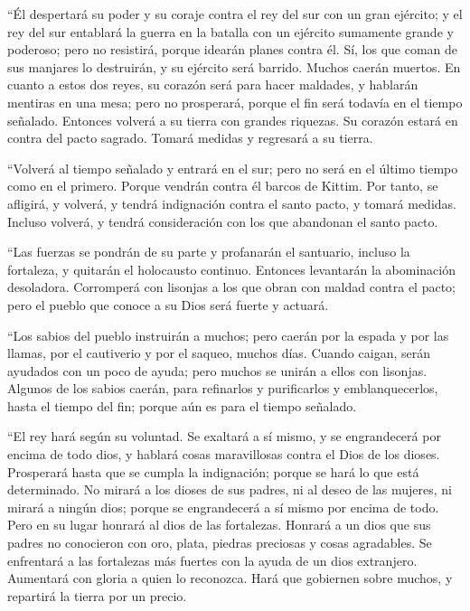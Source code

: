  ``Él despertará su poder y su coraje contra el rey del
sur con un gran ejército; y el rey del sur entablará la guerra en la
batalla con un ejército sumamente grande y poderoso; pero no resistirá,
porque idearán planes contra él.  Sí, los que coman de
sus manjares lo destruirán, y su ejército será barrido. Muchos caerán
muertos.  En cuanto a estos dos reyes, su corazón será
para hacer maldades, y hablarán mentiras en una mesa; pero no
prosperará, porque el fin será todavía en el tiempo señalado.
 Entonces volverá a su tierra con grandes riquezas. Su
corazón estará en contra del pacto sagrado. Tomará medidas y regresará a
su tierra.

 ``Volverá al tiempo señalado y entrará en el sur; pero
no será en el último tiempo como en el primero.  Porque
vendrán contra él barcos de Kittim. Por tanto, se afligirá, y volverá, y
tendrá indignación contra el santo pacto, y tomará medidas. Incluso
volverá, y tendrá consideración con los que abandonan el santo pacto.

 ``Las fuerzas se pondrán de su parte y profanarán el
santuario, incluso la fortaleza, y quitarán el holocausto continuo.
Entonces levantarán la abominación desoladora. 
Corromperá con lisonjas a los que obran con maldad contra el pacto; pero
el pueblo que conoce a su Dios será fuerte y actuará.

 ``Los sabios del pueblo instruirán a muchos; pero caerán
por la espada y por las llamas, por el cautiverio y por el saqueo,
muchos días.  Cuando caigan, serán ayudados con un poco
de ayuda; pero muchos se unirán a ellos con lisonjas. 
Algunos de los sabios caerán, para refinarlos y purificarlos y
emblanquecerlos, hasta el tiempo del fin; porque aún es para el tiempo
señalado.

 ``El rey hará según su voluntad. Se exaltará a sí mismo,
y se engrandecerá por encima de todo dios, y hablará cosas maravillosas
contra el Dios de los dioses. Prosperará hasta que se cumpla la
indignación; porque se hará lo que está determinado.  No
mirará a los dioses de sus padres, ni al deseo de las mujeres, ni mirará
a ningún dios; porque se engrandecerá a sí mismo por encima de todo.
 Pero en su lugar honrará al dios de las fortalezas.
Honrará a un dios que sus padres no conocieron con oro, plata, piedras
preciosas y cosas agradables.  Se enfrentará a las
fortalezas más fuertes con la ayuda de un dios extranjero. Aumentará con
gloria a quien lo reconozca. Hará que gobiernen sobre muchos, y
repartirá la tierra por un precio.

